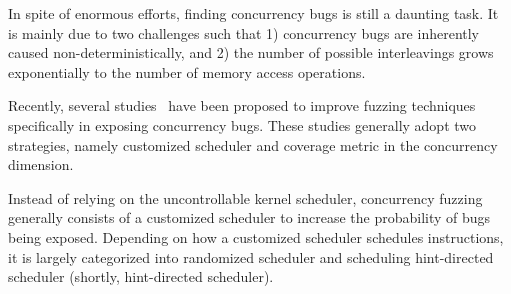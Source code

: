 

In spite of enormous efforts, finding concurrency bugs is still a
daunting task.
%
It is mainly due to two challenges such that 1) concurrency bugs are
inherently caused non-deterministically, and 2) the number of possible
interleavings grows exponentially to the number of memory access
operations.

Recently, several studies~\cite{razzer, krace, snowboard, muzz} have
been proposed to improve fuzzing techniques specifically in exposing
concurrency bugs.
%
These studies generally adopt two strategies, namely customized
scheduler and coverage metric in the concurrency dimension.




%
Instead of relying on the uncontrollable kernel scheduler, concurrency
fuzzing generally consists of a customized scheduler to increase the
probability of bugs being exposed.
%
Depending on how a customized scheduler schedules instructions, it is
largely categorized into randomized scheduler and scheduling
hint-directed scheduler (shortly, hint-directed scheduler).

